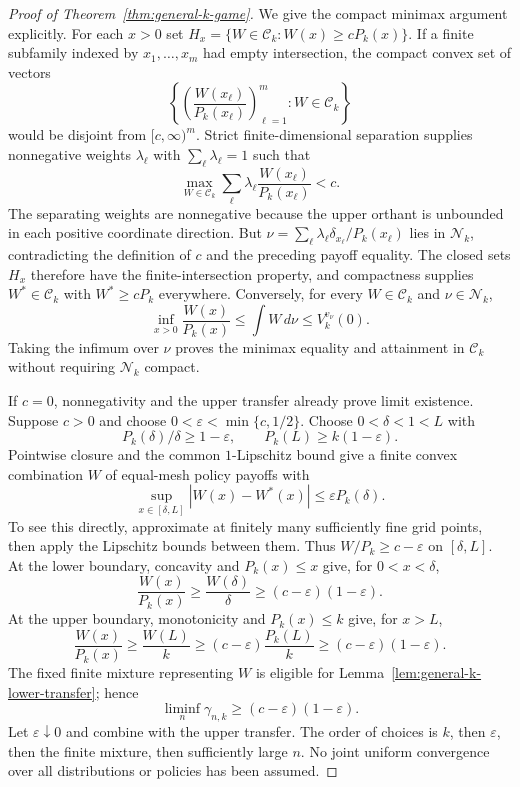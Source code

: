 \documentclass[11pt]{article}
\theoremstyle{remark}
\begin{document}
\begin{proof}[Proof of Theorem~\ref{thm:general-k-game}]
We give the compact minimax argument explicitly. For each $x>0$ set
$H_x=\{W\in\mathcal C_k:W(x)\ge cP_k(x)\}$. If a finite
subfamily indexed by $x_1,\ldots,x_m$ had empty intersection, the
compact convex set of vectors
\[
 \left\{\left(\frac{W(x_\ell)}{P_k(x_\ell)}\right)_{\ell=1}^m:
                    W\in\mathcal C_k\right\}
\]
would be disjoint from $[c,\infty)^m$. Strict finite-dimensional
separation supplies nonnegative weights $\lambda_\ell$ with
$\sum_\ell\lambda_\ell=1$ such that
\[
 \max_{W\in\mathcal C_k}\sum_\ell
 \lambda_\ell\frac{W(x_\ell)}{P_k(x_\ell)}<c.
\]
The separating weights are nonnegative because the upper orthant is
unbounded in each positive coordinate direction. But
$\nu=\sum_\ell\lambda_\ell\delta_{x_\ell}/P_k(x_\ell)$ lies
in $\mathcal N_k$, contradicting the definition of $c$ and the
preceding payoff equality. The closed sets $H_x$ therefore have the
finite-intersection property, and compactness supplies
$W^*\in\mathcal C_k$ with $W^*\ge cP_k$ everywhere. Conversely,
for every $W\in\mathcal C_k$ and $\nu\in\mathcal N_k$,
\[
 \inf_{x>0}\frac{W(x)}{P_k(x)}
 \le\int W\,d\nu\le V_k^{v_\nu}(0).
\]
Taking the infimum over $\nu$ proves the minimax equality and
attainment in $\mathcal C_k$ without requiring $\mathcal N_k$ compact.

If $c=0$, nonnegativity and the upper transfer already prove limit
existence. Suppose $c>0$ and choose
$0<\varepsilon<\min\{c,1/2\}$. Choose $0<\delta<1<L$ with
\[
 P_k(\delta)/\delta\ge1-\varepsilon,
 \qquad P_k(L)\ge k(1-\varepsilon).
\]
Pointwise closure and the common $1$-Lipschitz bound give a finite
convex combination $W$ of equal-mesh policy payoffs with
\[
 \sup_{x\in[\delta,L]}|W(x)-W^*(x)|\le\varepsilon P_k(\delta).
\]
To see this directly, approximate at finitely many sufficiently fine
grid points, then apply the Lipschitz bounds between them. Thus
$W/P_k\ge c-\varepsilon$ on $[\delta,L]$. At the lower boundary,
concavity and $P_k(x)\le x$ give, for $0<x<\delta$,
\[
 \frac{W(x)}{P_k(x)}\ge\frac{W(\delta)}\delta
 \ge(c-\varepsilon)(1-\varepsilon).
\]
At the upper boundary, monotonicity and $P_k(x)\le k$ give, for $x>L$,
\[
 \frac{W(x)}{P_k(x)}\ge\frac{W(L)}k
 \ge(c-\varepsilon)\frac{P_k(L)}k
 \ge(c-\varepsilon)(1-\varepsilon).
\]
The fixed finite mixture representing $W$ is eligible for
Lemma~\ref{lem:general-k-lower-transfer}; hence
\[
 \liminf_n\gamma_{n,k}\ge(c-\varepsilon)(1-\varepsilon).
\]
Let $\varepsilon\downarrow0$ and combine with the upper transfer.
The order of choices is $k$, then $\varepsilon$, then the finite
mixture, then sufficiently large $n$. No joint uniform convergence
over all distributions or policies has been assumed.
\end{proof}
\end{document}
